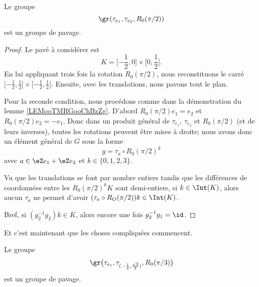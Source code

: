 \newcommand{\CaptionFigATJSooefYkmCbP}{Le compact \( K\) et son image par \( R_0(\pi)\) pour le lemme \ref{LEMooTMRGooChBzZg}.}


\begin{lemma}         \label{LEMooJPNDooHDCLnY}
    Le groupe
    \begin{equation}
        \gr(\tau_{e_1}, \tau_{e_2}, R_0(\pi/2))
    \end{equation}
    est un groupe de pavage.
\end{lemma}

\begin{proof}
    Le pavé à considérer est
    \begin{equation}
        K=\mathopen[ -\frac{ 1 }{2} , 0 \mathclose]\times \mathopen[ 0 , \frac{ 1 }{2} \mathclose].
    \end{equation}
    En lui appliquant trois fois la rotation \( R_0(\pi/2)\), nous reconstituons le carré \( \mathopen[ -\frac{ 1 }{2} , \frac{ 1 }{2} \mathclose]\times \mathopen[ -\frac{ 1 }{2} , \frac{ 1 }{2} \mathclose]\). Ensuite, avec les translations, nous pavons tout le plan.

    Pour la seconde condition, nous procédons comme dans la démonstration du lemme \ref{LEMooTMRGooChBzZg}. D'abord \( R_0(\pi/2)e_1=e_2\) et \( R_0(\pi/2)e_2=-e_1\). Donc dans un produit général de \( \tau_{e_1}\), \( \tau_{e_2}\) et \( R_0(\pi/2)\) (et de leurs inverses), toutes les rotations peuvent être mises à droite; nous avons donc un élément général de \( G\) sous la forme
    \begin{equation}
        g=\tau_a\circ R_0(\pi/2)^k
    \end{equation}
    avec \( a\in \eZ e_1+\eZ e_2\) et \( k\in \{ 0,1,2,3 \}\).
    
    Vu que les translations se font par nombre entiers tandis que les différences de coordonnées entre les \( R_0(\pi/2)^kK\) sont demi-entiers, si \( k\in \Int(K)\), alors aucun \( \tau_a\) ne permet d'avoir \( (\tau_a\circ R_O(\pi/2))k\in \Int(K)\).

    Bref, si \( (g_2^{-1}g_2)k\in K\), alors encore une fois \( g_2^{-1}g_1=\id\).
\end{proof}

Et c'est maintenant que les choses compliquées commencent.

\begin{lemma}       \label{LEMooMWWEooEbZXtb}
    Le groupe
    \begin{equation}
        \gr\big( \tau_{e_1},\tau_{(-\frac{ 1 }{2},\frac{ \sqrt{ 3 } }{2})},R_0(\pi/3) \big)
    \end{equation}
    est un groupe de pavage.
\end{lemma}

